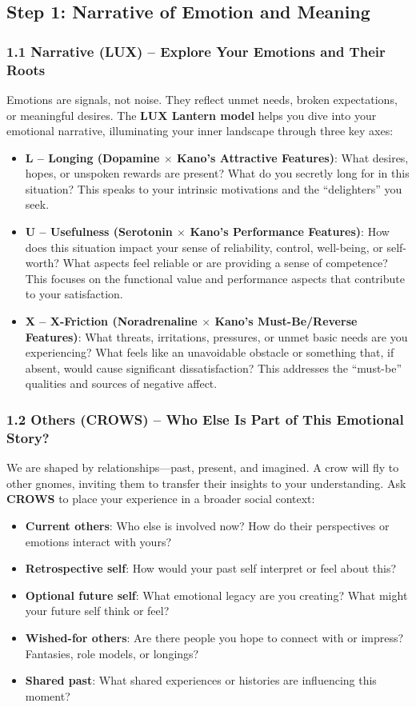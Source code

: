 \documentclass{article}
\begin{document}
\subsection{Step 1: Narrative of Emotion and Meaning}

\subsubsection{1.1 Narrative (LUX) – Explore Your Emotions and Their Roots}
Emotions are signals, not noise. They reflect unmet needs, broken expectations, or meaningful desires. The \textbf{LUX Lantern model} helps you dive into your emotional narrative, illuminating your inner landscape through three key axes:
\begin{itemize}[noitemsep,topsep=0pt]
    \item \textbf{L – Longing (Dopamine $\times$ Kano’s Attractive Features)}: What desires, hopes, or unspoken rewards are present? What do you secretly long for in this situation? This speaks to your intrinsic motivations and the ``delighters'' you seek.
    \item \textbf{U – Usefulness (Serotonin $\times$ Kano’s Performance Features)}: How does this situation impact your sense of reliability, control, well-being, or self-worth? What aspects feel reliable or are providing a sense of competence? This focuses on the functional value and performance aspects that contribute to your satisfaction.
    \item \textbf{X – X-Friction (Noradrenaline $\times$ Kano’s Must-Be/Reverse Features)}: What threats, irritations, pressures, or unmet basic needs are you experiencing? What feels like an unavoidable obstacle or something that, if absent, would cause significant dissatisfaction? This addresses the ``must-be'' qualities and sources of negative affect.
\end{itemize}

\subsubsection{1.2 Others (CROWS) – Who Else Is Part of This Emotional Story?}
We are shaped by relationships—past, present, and imagined. A crow will fly to other gnomes, inviting them to transfer their insights to your understanding. Ask \textbf{CROWS} to place your experience in a broader social context:
\begin{itemize}[noitemsep,topsep=0pt]
    \item \textbf{Current others}: Who else is involved now? How do their perspectives or emotions interact with yours?
    \item \textbf{Retrospective self}: How would your past self interpret or feel about this?
    \item \textbf{Optional future self}: What emotional legacy are you creating? What might your future self think or feel?
    \item \textbf{Wished-for others}: Are there people you hope to connect with or impress? Fantasies, role models, or longings?
    \item \textbf{Shared past}: What shared experiences or histories are influencing this moment?
\end{itemize}
\end{document}
